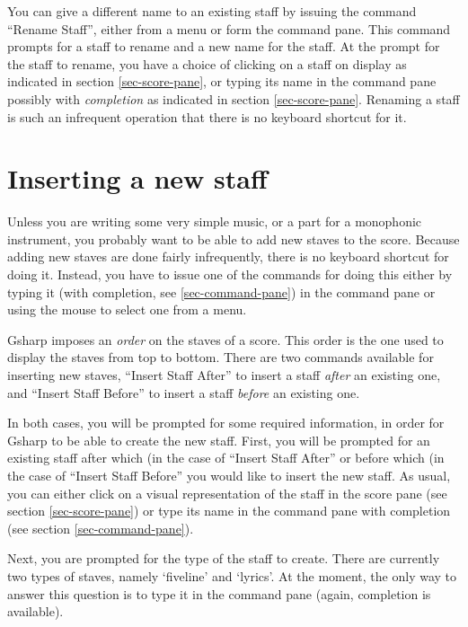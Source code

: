 \documentclass[11pt]{book}
\def\gs{Gsharp}
\def\command#1{``#1''}
\begin{document}
You can give a different name to an existing staff by issuing the
command \command{Rename Staff}, either from a menu or form the command
pane.  This command prompts for a staff to rename and a new name for
the staff.  At the prompt for the staff to rename, you have a choice
of clicking on a staff on display as indicated in section
\ref{sec-score-pane}, or typing its name in the command pane possibly
with \emph{completion} as indicated in section
\ref{sec-score-pane}.  Renaming a staff is such an infrequent
operation that there is no keyboard shortcut for it.

\section{Inserting a new staff}
\label{sec-inserting-staff}

Unless you are writing some very simple music, or a part for a
monophonic instrument, you probably want to be able to add new staves
to the score. Because adding new staves are done fairly infrequently,
there is no keyboard shortcut for doing it.  Instead, you have to
issue one of the commands for doing this either by typing it (with
completion, see \ref{sec-command-pane}) in the command pane or using
the mouse to select one from a menu.  

{\gs} imposes an \emph{order} on the staves of a score.  This order is
the one used to display the staves from top to bottom.  There are two
commands available for inserting new staves, \command{Insert Staff
  After} to insert a staff \emph{after} an existing one, and \command{Insert
  Staff Before} to insert a staff \emph{before} an existing one. 

In both cases, you will be prompted for some required information, in
order for {\gs} to be able to create the new staff.  First, you will
be prompted for an existing staff after which (in the case of
\command{Insert Staff After} or before which (in the case of
\command{Insert Staff Before} you would like to insert the new staff.
As usual, you can either click on a visual representation of the staff
in the score pane (see section \ref{sec-score-pane}) or type its name
in the command pane with completion (see section
\ref{sec-command-pane}). 

Next, you are prompted for the type of the staff to create.  There are
currently two types of staves, namely `fiveline' and `lyrics'.  At the
moment, the only way to answer this question is to type it in the
command pane (again, completion is available). 
\end{document}
